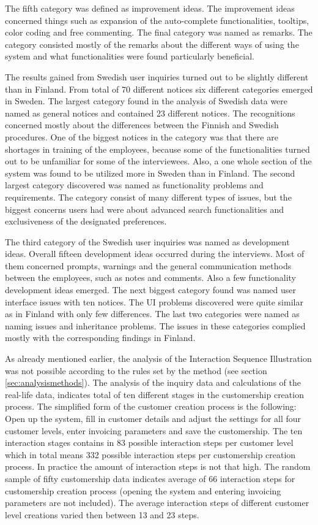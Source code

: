 \documentclass[12pt,a4paper,oneside,pdftex]{report}
\begin{document}
The fifth category was defined as improvement ideas. The improvement ideas concerned things such as expansion of the auto-complete functionalities, tooltips, color coding and free commenting. The final category was named as remarks. The category consisted mostly of the remarks about the different ways of using the system and what functionalities were found particularly beneficial.   
    
The results gained from Swedish user inquiries turned out to be slightly different than in Finland. From total of 70 different notices six different categories emerged in Sweden. The largest category found in the analysis of Swedish data were named as general notices and contained 23 different notices. The recognitions concerned mostly about the differences between the Finnish and Swedish procedures. One of the biggest notices in the category was that there are shortages in training of the employees, because some of the functionalities turned out to be unfamiliar for some of the interviewees. Also, a one whole section of the system was found to be utilized more in Sweden than in Finland. The second largest category discovered was named as functionality problems and requirements. The category consist of many different types of issues, but the biggest concerns users had were about advanced search functionalities and exclusiveness of the designated preferences. 

The third category of the Swedish user inquiries was named as development ideas. Overall fifteen development ideas occurred during the interviews. Most of them concerned prompts, warnings and the general communication methods between the employees, such as notes and comments. Also a few functionality development ideas emerged. The next biggest category found was named user interface issues with ten notices. The UI problems discovered were quite similar as in Finland with only few differences. The last two categories were named as naming issues and inheritance problems. The issues in these categories complied mostly with the corresponding findings in Finland. 

As already mentioned earlier, the analysis of the Interaction Sequence Illustration was not possible according to the rules set by the method (see section \ref{sec:analysismethods}). The analysis of the inquiry data and calculations of the real-life data, indicates total of ten different stages in the customership creation process. The simplified form of the customer creation process is the following: Open up the system, fill in customer details and adjust the settings for all four customer levels, enter invoicing parameters and save the customership. The ten interaction stages contains in 83 possible interaction steps per customer level which in total means 332 possible interaction steps per customership creation process. In practice the amount of interaction steps is not that high. The random sample of fifty customership data indicates average of 66 interaction steps for customership creation process (opening the system and entering invoicing parameters are not included). The average interaction steps of different customer level creations varied then between 13 and 23 steps.   
\end{document}
